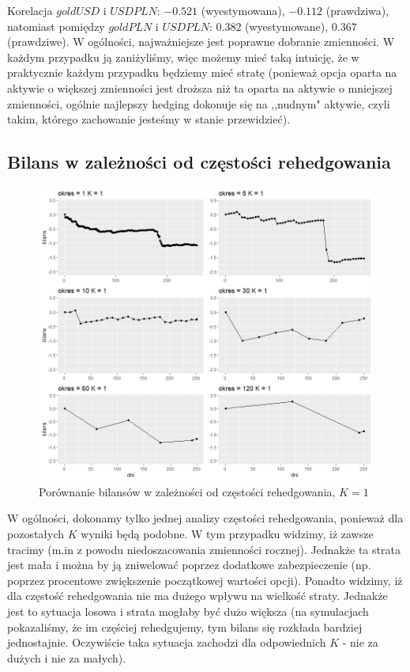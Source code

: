 \documentclass[12pt]{article}
\begin{document}
Korelacja $goldUSD$ i $USDPLN$: $-0.521$ (wyestymowana), $-0.112$ (prawdziwa), natomiast pomiędzy $goldPLN$ i $USDPLN$: $0.382$ (wyestymowane), $0.367$ (prawdziwe).
\newline
W ogólności, najważniejsze jest poprawne dobranie zmienności. W każdym przypadku ją zaniżyliśmy, więc możemy mieć taką intuicję, że w praktycznie każdym przypadku będziemy mieć stratę (ponieważ opcja oparta na aktywie o większej zmienności jest droższa niż ta oparta na aktywie o mniejszej zmienności, ogólnie najlepszy hedging dokonuje się na ,,nudnym" aktywie, czyli takim, którego zachowanie jesteśmy w stanie przewidzieć).
\newpage
\subsection{Bilans w zależności od częstości rehedgowania}

\begin{figure}[ht!]
\centering
\includegraphics[width=\linewidth]{bilans_prawdziwa_trajektoria_gold_1_rowna_skala.png}
\caption{Porównanie bilansów w zależności od częstości rehedgowania, $K=1$}
\end{figure}

W ogólności, dokonamy tylko jednej analizy częstości rehedgowania, ponieważ dla pozostałych $K$ wyniki będą podobne. W tym przypadku widzimy, iż zawsze tracimy (m.in z powodu niedoszacowania zmienności rocznej). Jednakże ta strata jest mała i można by ją zniwelować poprzez dodatkowe zabezpieczenie (np. poprzez procentowe zwiększenie początkowej wartości opcji). Ponadto widzimy, iż dla częstość rehedgowania nie ma dużego wpływu na wielkość straty. Jednakże jest to sytuacja losowa i strata mogłaby być dużo większa (na symulacjach pokazaliśmy, że im częściej rehedgujemy, tym bilans się rozkłada bardziej jednostajnie. Oczywiście taka sytuacja zachodzi dla odpowiednich $K$ - nie za dużych i nie za małych).
\end{document}
